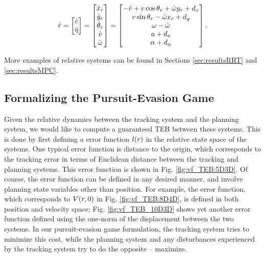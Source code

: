 \begin{equation}
\label{eq:5D_and_3D_rdyn}
\dot \rstate = 
\begin{bmatrix}
\dot \estate\\
\dot \astate
\end{bmatrix}
=
\begin{bmatrix}
\dot x_r\\
\dot y_r\\
\dot\theta_r\\
\dot v\\
\dot \omega
\end{bmatrix}
=
\begin{bmatrix}
- \hat v + v \cos \theta_r + \hat \omega y_r + \dstb_x\\
v \sin \theta_r - \hat \omega x_r + \dstb_y\\
\omega - \hat \omega \\
a + \dstb_a\\
\alpha + \dstb_\alpha
\end{bmatrix}.
\end{equation}

More examples of relative systems can be found in Sections \ref{sec:resultsRRT} and \ref{sec:resultsMPC}.

\subsection{Formalizing the Pursuit-Evasion Game}
Given the relative dynamics between the tracking system and the planning system, we would like to compute a guaranteed TEB between these systems. 
This is done by first defining a error function $l(r)$ in the relative state space of the systems. 
One typical error function is distance to the origin, which corresponds to the tracking error in terms of Euclidean distance between the tracking and planning systems. 
This error function is shown in Fig. \ref{fig:vf_TEB:5D3D}. 
Of course, the error function can be defined in any desired manner, and involve planning state variables other than position.
For example, the error function, which corresponds to $V(r, 0)$ in Fig. \ref{fig:vf_TEB:8D4D}, is defined in both position and velocity space; Fig. \ref{fig:vf_TEB_10D3D} shows yet another error function defined using the one-norm of the displacement between the two systems. 
In our pursuit-evasion game formulation, the tracking system tries to minimize this cost, while the planning system and any disturbances experienced by the tracking system try to do the opposite -- maximize.

